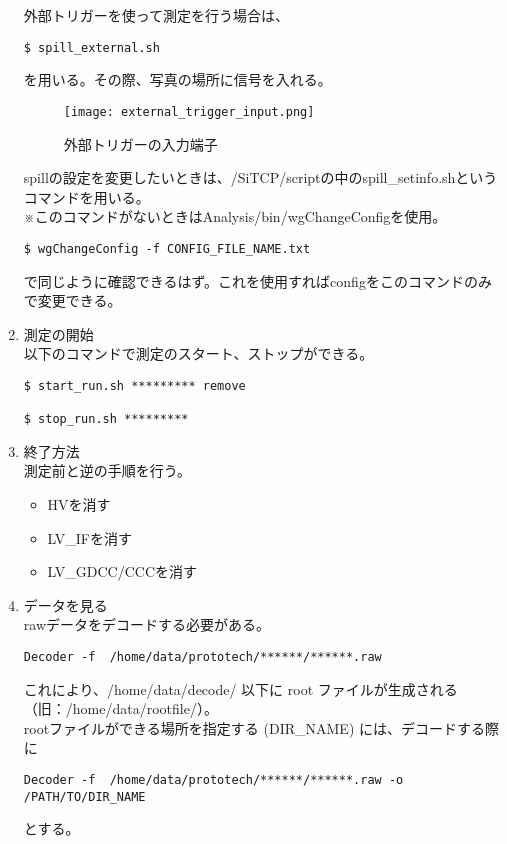 \begin{enumerate}
外部トリガーを使って測定を行う場合は、
\begin{screen}
\begin{verbatim}
$ spill_external.sh
\end{verbatim}
\end{screen}
を用いる。その際、写真の場所に信号を入れる。

\begin{figure}[H]
\begin{center}
\texttt{[image: external\_trigger\_input.png]}
\end{center}
\caption{外部トリガーの入力端子}
\label{fig:}
\end{figure}

spillの設定を変更したいときは、/SiTCP/scriptの中のspill\_setinfo.shというコマンドを用いる。\\
※このコマンドがないときはAnalysis/bin/wgChangeConfigを使用。
\begin{screen}
\begin{verbatim}
$ wgChangeConfig -f CONFIG_FILE_NAME.txt
\end{verbatim}
\end{screen}
で同じように確認できるはず。これを使用すればconfigをこのコマンドのみで変更できる。

\item 測定の開始\\
以下のコマンドで測定のスタート、ストップができる。
\begin{screen}
\begin{verbatim}
$ start_run.sh ********* remove

$ stop_run.sh *********
\end{verbatim}
\end{screen}

\item 終了方法\\
測定前と逆の手順を行う。
\begin{itemize}
\item HVを消す
\item LV\_IFを消す
\item LV\_GDCC/CCCを消す
\end{itemize}

\item データを見る\\
rawデータをデコードする必要がある。
\begin{screen}
\begin{verbatim}
Decoder -f  /home/data/prototech/******/******.raw
\end{verbatim}
\end{screen}
これにより、/home/data/decode/ 以下に root ファイルが生成される（旧：/home/data/rootfile/）。\\
rootファイルができる場所を指定する (DIR\_NAME) には、デコードする際に
\begin{screen}
\begin{verbatim}
Decoder -f  /home/data/prototech/******/******.raw -o /PATH/TO/DIR_NAME
\end{verbatim}
\end{screen}
とする。\\


\end{enumerate}
